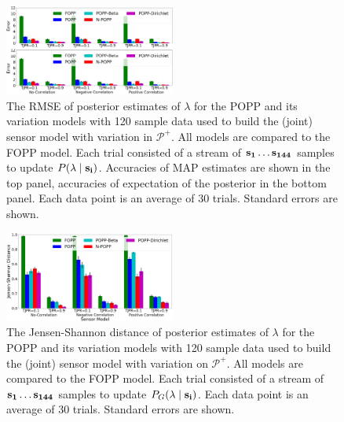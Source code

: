 \begin{figure}[t!]
	\centering
	\includegraphics[width=0.5\textwidth]{./figures/tjpr_comparison_120.png}
    \caption{The RMSE of posterior estimates of $\lambda$ for the POPP and its variation models with 120 sample data used to build the (joint) sensor model with variation in $\mathcal{P^+}$. All models are compared to the FOPP model. Each trial consisted of a stream of $\protect\mathbf{s_1} \ldots \protect\mathbf{s_{144}}$ samples to update $P(\lambda \mid \protect\mathbf{s_i})$. Accuracies of MAP estimates are shown in the top panel, accuracies of expectation of the posterior in the bottom panel. Each data point is an average of 30 trials. Standard errors are shown.} 
	\label{fig:tjpr_comparison_120}
\end{figure}

\begin{figure}[t!]
	\centering
	\includegraphics[width=0.5\textwidth]{./figures/tjpr_comparison_120_kl.png}
	\caption{The Jensen-Shannon distance of posterior estimates of $\lambda$ for the POPP and its variation models with 120 sample data used to build the (joint) sensor model with variation on $\mathcal{P^+}$. All models are compared to the FOPP model. Each trial consisted of a stream of $\protect\mathbf{s_1} \ldots \protect\mathbf{s_{144}}$ samples to update $P_G(\lambda \mid \protect\mathbf{s_i})$. Each data point is an average of 30 trials. Standard errors are shown.} 
	\label{fig:tjpr_comparison_120_kl}
\end{figure}



